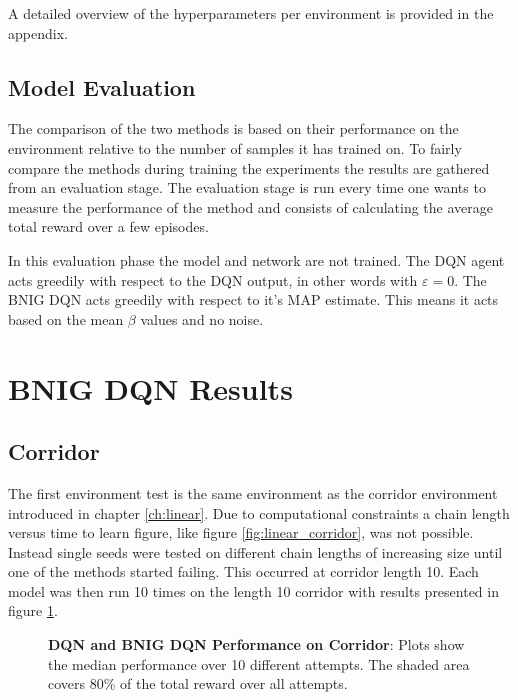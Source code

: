A detailed overview of the hyperparameters per environment is provided in the appendix.

\subsection{Model Evaluation}

The comparison of the two methods is based on their performance on the environment relative to the number of samples it has trained on. To fairly compare the methods during training the experiments the results are gathered from an evaluation stage. The evaluation stage is run every time one wants to measure the performance of the method and consists of calculating the average total reward over a few episodes.

In this evaluation phase the model and network are not trained. The DQN agent acts greedily with respect to the DQN output, in other words with $\varepsilon=0$. The BNIG DQN acts greedily with respect to it's MAP estimate. This means it acts based on the mean $\beta$ values and no noise.

\section{BNIG DQN Results}

\subsection{Corridor}


The first environment test is the same environment as the corridor environment introduced in chapter \ref{ch:linear}. Due to computational constraints a chain length versus time to learn figure, like figure \ref{fig:linear_corridor}, was not possible. Instead single seeds were tested on different chain lengths of increasing size until one of the methods started failing. This occurred at corridor length 10. Each model was then run 10 times on the length 10 corridor with results presented in figure \ref{fig:nn_corridor}.

\begin{figure}[H]
    \centering
    \caption{\textbf{DQN and BNIG DQN Performance on Corridor}: Plots show the median performance over 10 different attempts. The shaded area covers 80\% of the total reward over all attempts.}
    \label{fig:nn_corridor}
\end{figure}

